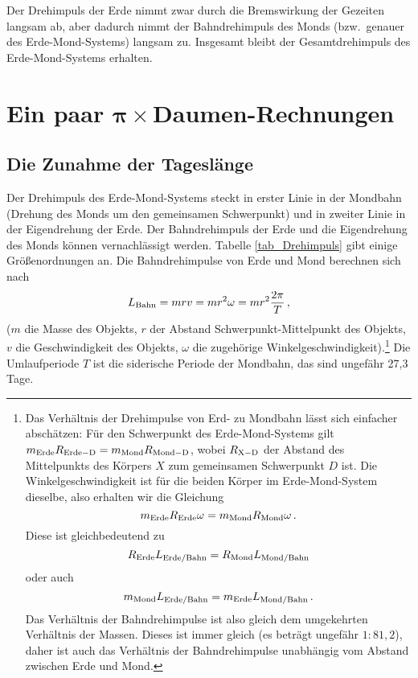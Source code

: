 Der Dreh\-impuls
der Erde nimmt zwar durch die Bremswirkung der Gezeiten langsam ab, aber dadurch
nimmt der Bahndrehimpuls des Monds (bzw.\ genauer des Erde-Mond-Systems) langsam
zu. Insgesamt bleibt der Gesamtdrehimpuls des Erde-Mond-Systems erhalten. 

\section{Ein paar \glqq $\pmb{\pi} \times$Daumen\grqq-Rechnungen}

\subsection{Die Zunahme der Tagesl\"ange}

Der Drehimpuls des Erde-Mond-Systems steckt in erster Linie in der
Mondbahn (Drehung des Monds um den gemeinsamen Schwerpunkt) und
in zweiter Linie in der Eigendrehung der Erde. Der Bahndrehimpuls der Erde und die
Eigendrehung des Monds k\"onnen vernachl\"assigt werden. Tabelle \ref{tab_Drehimpuls} gibt
einige Gr\"o\ss enordnungen an. Die Bahndrehimpulse von Erde und Mond berechnen
sich nach
\begin{equation}
\label{eq_Bahndrehimpuls}
             L_{\rm Bahn} = m r v = m r^2 \omega = m r^2 \frac{2\pi}{T} \, ,
\end{equation}
($m$ die Masse des Objekts, $r$ der Abstand Schwerpunkt-Mittelpunkt des Objekts, $v$ die 
Geschwindigkeit des Objekts, $\omega$ die zugeh\"orige Winkelgeschwindigkeit).\footnote{
Das Verh\"altnis der Drehimpulse von Erd- zu Mondbahn l\"asst sich einfacher absch\"atzen:
F\"ur den Schwerpunkt des Erde-Mond-Systems gilt 
$m_{\rm Erde} R_{\rm Erde-D}=m_{\rm Mond} R_{\rm Mond-D}$,
wobei $R_{\rm X-D}$ der Abstand des Mittelpunkts des K\"orpers $X$ zum gemeinsamen Schwerpunkt
$D$ ist. Die Winkelgeschwindigkeit ist f\"ur die beiden K\"orper im Erde-Mond-System dieselbe, also
erhalten wir die Gleichung
\[   m_{\rm Erde} R_{\rm Erde} \omega = m_{\rm Mond} R_{\rm Mond}  \omega \, .\]
Diese ist gleichbedeutend zu
\[   R_{\rm Erde} L_{\rm Erde/Bahn} =  R_{\rm Mond} L_{\rm Mond/Bahn} \]
oder auch
\[   m_{\rm Mond} L_{\rm Erde/Bahn} =  m_{\rm Erde} L_{\rm Mond/Bahn}  \, .\]
Das Verh\"altnis der Bahndrehimpulse ist also gleich dem umgekehrten Verh\"altnis der Massen.
Dieses ist immer gleich (es betr\"agt ungef\"ahr $1:81,2$), daher ist auch das Verh\"altnis der Bahndrehimpulse 
unabh\"angig vom Abstand zwischen Erde und Mond. } 
Die Umlaufperiode $T$ ist die siderische Periode der Mondbahn, das sind ungef\"ahr 27,3 Tage.
